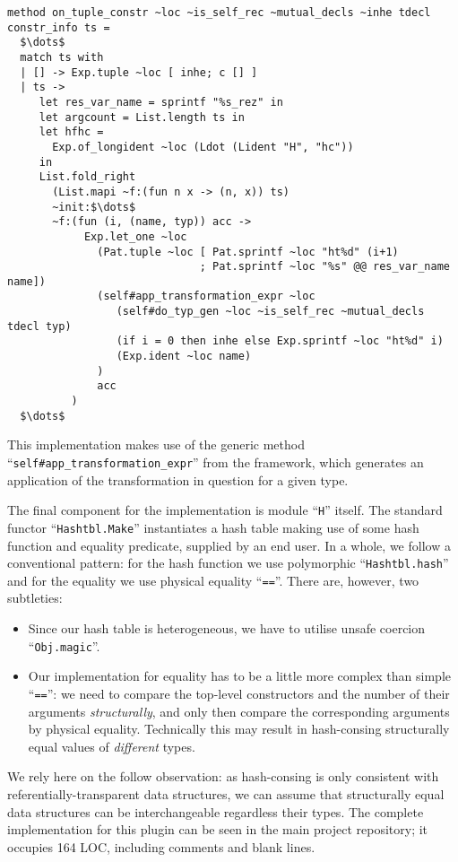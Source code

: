 \begin{lstlisting}
method on_tuple_constr ~loc ~is_self_rec ~mutual_decls ~inhe tdecl constr_info ts =
  $\dots$ 
  match ts with
  | [] -> Exp.tuple ~loc [ inhe; c [] ]
  | ts ->
     let res_var_name = sprintf "%s_rez" in
     let argcount = List.length ts in
     let hfhc =
       Exp.of_longident ~loc (Ldot (Lident "H", "hc"))
     in
     List.fold_right
       (List.mapi ~f:(fun n x -> (n, x)) ts)
       ~init:$\dots$
       ~f:(fun (i, (name, typ)) acc ->
            Exp.let_one ~loc
              (Pat.tuple ~loc [ Pat.sprintf ~loc "ht%d" (i+1)
                              ; Pat.sprintf ~loc "%s" @@ res_var_name name])
              (self#app_transformation_expr ~loc
                 (self#do_typ_gen ~loc ~is_self_rec ~mutual_decls tdecl typ)
                 (if i = 0 then inhe else Exp.sprintf ~loc "ht%d" i)
                 (Exp.ident ~loc name)
              )
              acc
          )
  $\dots$
\end{lstlisting}

This implementation makes use of the generic method ``\lstinline{self#app_transformation_expr}'' from the framework, which generates an application of
the transformation in question for a given type.

The final component for the implementation is module ``\lstinline{H}'' itself. The standard functor ``\lstinline{Hashtbl.Make}'' instantiates a
hash table making use of some hash function and equality predicate, supplied by an end user. In a whole, we follow a conventional pattern:
for the hash function we use polymorphic ``\lstinline{Hashtbl.hash}'' and for the equality we use physical equality ``\lstinline{==}''. There are, however, two
subtleties:

\begin{itemize}
\item Since our hash table is heterogeneous, we have to utilise unsafe coercion ``\lstinline{Obj.magic}''.
\item Our implementation for equality has to be a little more complex than simple ``\lstinline{==}'': we need to compare the top-level constructors and
  the number of their arguments \emph{structurally}, and only then compare the corresponding arguments by physical equality. Technically this
  may result in hash-consing structurally equal values of \emph{different} types.
\end{itemize}

We rely here on the follow observation: as hash-consing is only consistent with referentially-transparent data structures, we can assume
that structurally equal data structures can be interchangeable regardless their types. The complete implementation for this plugin can be seen in the main project
repository; it occupies 164 LOC, including comments and blank lines.
